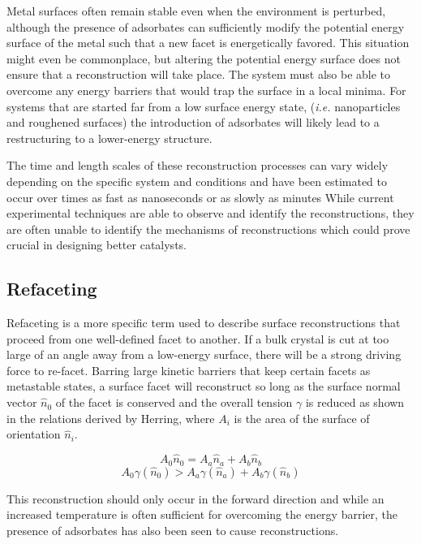 Metal surfaces often remain stable even when the environment is perturbed,
although the presence of adsorbates can sufficiently modify the potential
energy surface of the metal such that a new facet is energetically favored.
This situation might even be commonplace, but altering the potential energy
surface does not ensure that a reconstruction will take place. The system must
also be able to overcome any energy barriers that would trap the surface in a
local minima.  For systems that are started far from a low surface energy
state, ({\em i.e.} nanoparticles and roughened surfaces) the introduction of
adsorbates will likely lead to a restructuring to a lower-energy structure. 

The time and length scales of these reconstruction processes can vary widely
depending on the specific system and conditions and have been estimated to occur
over times as fast as nanoseconds or as slowly as minutes\citep{Tao:2010aa,
Eren:2016qt} While current experimental techniques are able to observe and
identify the reconstructions, they are often unable to identify the 
mechanisms of reconstructions which could prove crucial in designing better
catalysts.

\subsection{Refaceting}
Refaceting is a more specific term used to describe surface reconstructions
that proceed from one well-defined facet to another.  If a bulk crystal is cut
at too large of an angle away from a low-energy surface, there will be a strong
driving force to re-facet. Barring large kinetic barriers that keep certain
facets as metastable states, a surface facet will reconstruct so long as the
surface normal vector $\hat{n}_0$ of the facet is conserved and the overall
tension $\gamma$ is reduced as shown in the relations derived by
Herring\citep{Herring:1951ta}, where $A_i$ is the area of the surface of
orientation $\hat{n}_i$.

\begin{equation}
A_0\hat{n}_0 = A_a\hat{n}_a + A_b\hat{n}_b
\end{equation}
\begin{equation}
A_0\gamma(\hat{n}_0) > A_a\gamma(\hat{n}_a) + A_b\gamma(\hat{n}_b)
\end{equation}

This reconstruction should only occur in the forward direction and while an
increased temperature is often sufficient for overcoming the energy barrier,
the presence of adsorbates has also been seen to cause
reconstructions.\citep{Eren:2016qt, Williams:1994aa, Jeong:1999ev} 

